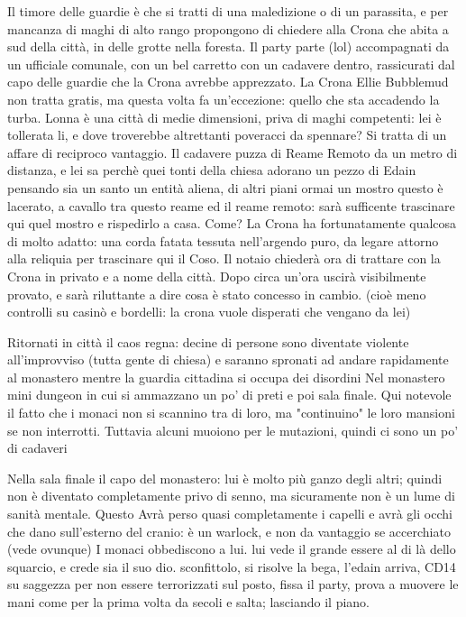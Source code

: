 \documentclass[10pt,twoside, twocolumn, openany]{dndbook}
\begin{document}
Il timore delle guardie è che si tratti di una maledizione o di un parassita, e per mancanza di maghi di alto rango propongono di chiedere alla Crona che abita a sud della città, in delle grotte nella foresta.
Il party parte (lol) accompagnati da un ufficiale comunale, con un bel carretto con un cadavere dentro, rassicurati dal capo delle guardie che la Crona avrebbe apprezzato.
La Crona Ellie Bubblemud non tratta gratis, ma questa volta fa un'eccezione: quello che sta accadendo la turba. Lonna è una città di medie dimensioni, priva di maghi competenti: lei è tollerata li, e dove troverebbe altrettanti poveracci da spennare?
Si tratta di un affare di reciproco vantaggio.
Il cadavere puzza di Reame Remoto da un metro di distanza, e lei sa perchè
quei tonti della chiesa adorano un pezzo di Edain pensando sia un santo 
un entità aliena, di altri piani
ormai un mostro 
questo è lacerato, a cavallo tra questo reame ed il reame remoto: sarà sufficente trascinare qui quel mostro e rispedirlo a casa. Come?
La Crona ha fortunatamente qualcosa di molto adatto: una corda fatata tessuta nell'argendo puro, da legare attorno alla reliquia per trascinare qui il Coso.
Il notaio chiederà ora di trattare con la Crona in privato e a nome della città. Dopo circa un'ora uscirà visibilmente provato, e sarà riluttante a dire cosa è stato concesso in cambio.
(cioè meno controlli su casinò e bordelli: la crona vuole disperati che vengano da lei)

Ritornati in città il caos regna: decine di persone sono diventate violente all'improvviso (tutta gente di chiesa) e saranno spronati ad andare rapidamente al monastero mentre la guardia cittadina si occupa dei disordini
Nel monastero mini dungeon in cui si ammazzano un po' di preti e poi sala finale. Qui notevole il fatto che i monaci non si scannino tra di loro, ma "continuino" le loro mansioni se non interrotti. 
Tuttavia alcuni muoiono per le mutazioni, quindi ci sono un po' di cadaveri

Nella sala finale il capo del monastero: lui è molto più ganzo degli altri; quindi non è diventato completamente privo di senno, ma sicuramente non è un lume di sanità mentale.
Questo Avrà perso quasi completamente i capelli e avrà gli occhi che dano sull'esterno del cranio: è un warlock, e non da vantaggio se accerchiato (vede ovunque)
I monaci obbediscono a lui. lui vede il grande essere al di là dello squarcio, e crede sia il suo dio.
sconfittolo, si risolve la bega, l'edain arriva, CD14 su saggezza per non essere terrorizzati sul posto, fissa il party, prova a muovere le mani come per la prima volta da secoli e salta; lasciando il piano.
\end{document}
